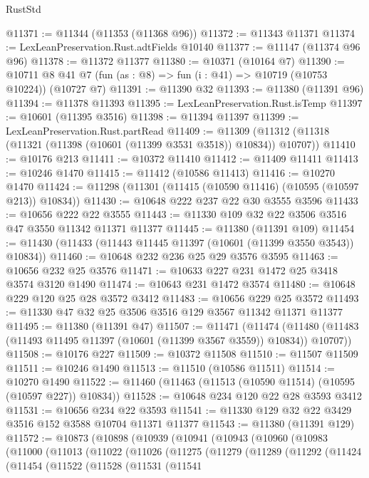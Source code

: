 \begin{lexlean}{RustStd}
\begin{coremodule}
@11371 := @11344 (@11353 (@11368 @96))
@11372 := @11343 @11371
@11374 := LexLeanPreservation.Rust.adtFields @10140
@11377 := @11147 (@11374 @96 @96)
@11378 := @11372 @11377
@11380 := @10371 (@10164 @7)
@11390 := @10711 @8 @41 @7 (fun (as : @8) => fun (i : @41) => @10719 (@10753 @10224)) (@10727 @7)
@11391 := @11390 @32
@11393 := @11380 (@11391 @96)
@11394 := @11378 @11393
@11395 := LexLeanPreservation.Rust.isTemp
@11397 := @10601 (@11395 @3516)
@11398 := @11394 @11397
@11399 := LexLeanPreservation.Rust.partRead
@11409 := @11309 (@11312 (@11318 (@11321 (@11398 (@10601 (@11399 @3531 @3518)) @10834)) @10707))
@11410 := @10176 @213
@11411 := @10372 @11410
@11412 := @11409 @11411
@11413 := @10246 @1470
@11415 := @11412 (@10586 @11413)
@11416 := @10270 @1470
@11424 := @11298 (@11301 (@11415 (@10590 @11416) (@10595 (@10597 @213)) @10834))
@11430 := @10648 @222 @237 @22 @30 @3555 @3596
@11433 := @10656 @222 @22 @3555
@11443 := @11330 @109 @32 @22 @3506 @3516 @47 @3550 @11342 @11371 @11377
@11445 := @11380 (@11391 @109)
@11454 := @11430 (@11433 (@11443 @11445 @11397 (@10601 (@11399 @3550 @3543)) @10834))
@11460 := @10648 @232 @236 @25 @29 @3576 @3595
@11463 := @10656 @232 @25 @3576
@11471 := @10633 @227 @231 @1472 @25 @3418 @3574 @3120 @1490
@11474 := @10643 @231 @1472 @3574
@11480 := @10648 @229 @120 @25 @28 @3572 @3412
@11483 := @10656 @229 @25 @3572
@11493 := @11330 @47 @32 @25 @3506 @3516 @129 @3567 @11342 @11371 @11377
@11495 := @11380 (@11391 @47)
@11507 := @11471
    (@11474 (@11480 (@11483 (@11493 @11495 @11397 (@10601 (@11399 @3567 @3559)) @10834)) @10707))
@11508 := @10176 @227
@11509 := @10372 @11508
@11510 := @11507 @11509
@11511 := @10246 @1490
@11513 := @11510 (@10586 @11511)
@11514 := @10270 @1490
@11522 := @11460 (@11463 (@11513 (@10590 @11514) (@10595 (@10597 @227)) @10834))
@11528 := @10648 @234 @120 @22 @28 @3593 @3412
@11531 := @10656 @234 @22 @3593
@11541 := @11330 @129 @32 @22 @3429 @3516 @152 @3588 @10704 @11371 @11377
@11543 := @11380 (@11391 @129)
@11572 := @10873
    (@10898
      (@10939
        (@10941
          (@10943
            (@10960
              (@10983
                (@11000
                  (@11013
                    (@11022
                      (@11026
                        (@11275
                          (@11279
                            (@11289
                              (@11292
                                (@11424
                                  (@11454
                                    (@11522
                                      (@11528
                                        (@11531
                                          (@11541

\end{coremodule}
\end{lexlean}
